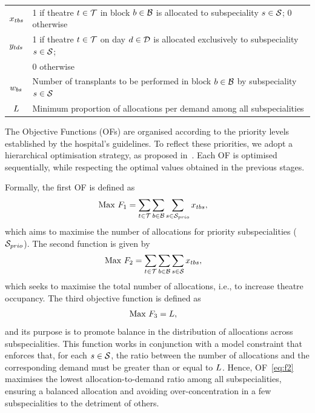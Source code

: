 \documentclass[review,3p,authoryear]{elsarticle}
\begin{document}
\begin{table}
\begin{tabular}{cl}
    \midrule
        $x_{tbs}$                                        & 1 if theatre $t \in \mathcal{T}$ in block $b \in \mathcal{B}$ is allocated to subspeciality $s \in \mathcal{S}$; 0 otherwise                \\
        $y_{tds}$                                         & 1 if theatre $t \in \mathcal{T}$ on day $d \in \mathcal{D}$ is allocated exclusively to subspeciality $s \in \mathcal{S}$;\\
                                                           & 0 otherwise                                  \\
        $w_{bs}$                                      & Number of transplants to be performed in block $b \in \mathcal{B}$ by subspeciality $s \in \mathcal{S}$ \\
        $L$                                      & Minimum proportion of allocations per demand among all subspecialities   \\
    \bottomrule
    \end{tabular}
\end{table}

The Objective Functions (OFs) are organised according to the priority levels established by the hospital's guidelines.
To reflect these priorities, we adopt a hierarchical optimisation strategy, as proposed in~\citet{Aringhieri2022Hierarchical}.
Each OF is optimised sequentially, while respecting the optimal values obtained in the previous stages.

Formally, the first OF is defined as
\begin{align}
\text{Max } \displaystyle F_1 & = \sum_{t \in \mathcal{T}} \sum_{b \in \mathcal{B}} \sum_{s \in \mathcal{S}_{prio}} x_{tbs}, \label{eq:f0}
\end{align}
which aims to maximise the number of allocations for priority subspecialities ($\mathcal{S}_{prio}$).
The second function is given by
\begin{align}
\text{Max } \displaystyle F_2 & = \sum_{t \in \mathcal{T}} \sum_{b \in \mathcal{B}} \sum_{s \in \mathcal{S}} x_{tbs}, \label{eq:f1}
\end{align}
which seeks to maximise the total number of allocations, i.e., to increase theatre occupancy.
The third objective function is defined as
\begin{align}
\text{Max } \displaystyle F_3 & = L, \label{eq:f2}
\end{align}
and its purpose is to promote balance in the distribution of allocations across subspecialities.
This function works in conjunction with a model constraint that enforces that, for each $s \in \mathcal{S}$, the ratio between the number of allocations and the corresponding demand must be greater than or equal to $L$.
Hence, OF~\eqref{eq:f2} maximises the lowest allocation-to-demand ratio among all subspecialities, ensuring a balanced allocation and avoiding over-concentration in a few subspecialities to the detriment of others.
\end{document}
